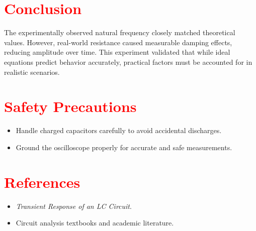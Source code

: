 \documentclass[a4paper,12pt]{article}
\begin{document}
\section{\textcolor{red}{Conclusion}}
\begin{tcolorbox}[colframe=red!70!black,colback=yellow!10!white]
The experimentally observed natural frequency closely matched theoretical values. However, real-world resistance caused measurable damping effects, reducing amplitude over time. This experiment validated that while ideal equations predict behavior accurately, practical factors must be accounted for in realistic scenarios.
\end{tcolorbox}

\section{\textcolor{red}{Safety Precautions}}
\begin{tcolorbox}[colframe=purple!70!black,colback=magenta!10!white]
\begin{itemize}
\item Handle charged capacitors carefully to avoid accidental discharges.
\item Ground the oscilloscope properly for accurate and safe measurements.
\end{itemize}
\end{tcolorbox}

\section{\textcolor{red}{References}}
\begin{tcolorbox}[colframe=green!70!black,colback=yellow!10!white]
\begin{itemize}
\item \textit{Transient Response of an LC Circuit}.
\item Circuit analysis textbooks and academic literature.
\end{itemize}
\end{tcolorbox}
\end{document}
